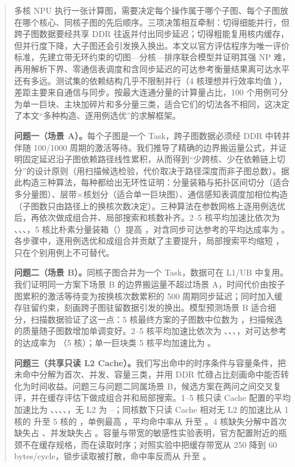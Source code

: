 \begin{abstract}
多核 NPU 执行一张计算图，需要决定每个操作属于哪个子图、每个子图放在哪个核心、同核子图的先后顺序。三项决策相互牵制：切得细能并行，但跨子图数据要经共享 DDR 往返并付出同步延迟；切得粗能复用核内缓存，但并行度下降，大子图还会引发换入换出。本文以官方评估程序为唯一评价标准，先建立带无环约束的切图—分核—排序联合模型并证明其强 NP 难，再用解析下界、零通信表调度和含同步延迟的可达参考衡量结果离可达水平还有多远。测试集的依赖结构几乎不限制并行（4 核理想并行效率均值 ），差距主要来自通信与同步。按最大连通分量的计算量占比，100 个用例可分为单一巨块、主块加碎片和多分量三类，适合它们的切法各不相同，这决定了本文“多种构造、逐用例选优”的求解框架。

\textbf{问题一（场景 A）。}每个子图是一个 Task，跨子图数据必须经 DDR 中转并伴随 100/1000 周期的激活等待。我们推导了精确的边界搬运量公式，并证明固定延迟沿子图依赖路径线性累积，从而得到“少跨核、少在依赖链上切分”的设计原则（用扫描候选检验，代价取决于路径深度而非子图总数）。据此构造三种算法，每种都给出无环性证明：分量装箱与拓扑区间切分（适合多分量图）、层带$\times$核划分（适合单一巨块图）、通信感知表调度加相位构造（子图数只由路径上的换核次数决定）。三种算法在参数网格上逐用例选优后，再依次做成组合并、局部搜索和核数补齐。2--5 核平均加速比依次为 、、、，5 核比朴素分量装箱（）提高 ，对含同步可达参考的平均达成率为 。各步骤中，逐用例选优和成组合并贡献了主要提升，局部搜索平均缩短 ，只在个别用例上不可替代。

\textbf{问题二（场景 B）。}同核子图合并为一个 Task，数据可在 L1/UB 中复用。我们证明同一方案下场景 B 的边界搬运量不超过场景 A，时间代价由按子图累积的激活等待变为按换核次数累积的 500 周期同步延迟；同时加入缓存驻留约束，刻画跨子图驻留数据引发的换出。模型预测场景 B 适合细分，扫描数据验证了这一点：5 核最终方案的子图数中位数为 ，扫描候选的质量随子图数增加单调变好。2--5 核平均加速比依次为 、、、，对可达参考的达成率为 （5 核）；单一巨块类 5 核平均加速比为 。

\textbf{问题三（共享只读 L2 Cache）。}我们写出命中的时序条件与容量条件，把未命中分解为首次、并发、容量三类，并用 DDR 忙碌占比刻画命中能否转化为时间收益。问题三与问题二同属场景 B，候选方案在两问之间交叉复评，并在缓存评估下做成组合并和局部搜索。1--5 核只读 Cache 配置的平均加速比为 、、、、，无 L2 为 --；同核数下只读 Cache 相对无 L2 的加速比从 1 核的  升至 5 核的 ，单例最高 ，平均命中率从  升至 。4 核缺失分解中首次缺失占 、并发缺失占 。容量与带宽的敏感性实验表明，官方配置附近的瓶颈不在缓存规格，而在读取时序；对照实验中把缓存带宽从 250 降到 60 bytes/cycle，锁步读取被打散，命中率反而从  升至 。


\end{abstract}
